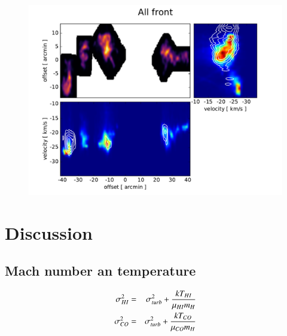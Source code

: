 \documentclass[traditabstract]{aa}
\begin{document}

\begin{figure}[h]
  \centering
  \includegraphics[page=2,width=\linewidth,trim=30 10 55 30,clip=true]{Figures/PV_diagrams.pdf}
  \caption{}
\end{figure}



\section{Discussion}
\label{sec:discussion}

   \subsection{Mach number an temperature}

\begin{eqnarray}
  \sigma_{H\rmnum{1}}^2 &=& \sigma_{turb}^2+\frac{k T_{H\rmnum{1}}}{\mu_{H\rmnum{1}} m_H} \\
  \sigma_{CO}^2         &=& \sigma_{turb}^2+\frac{k T_{CO}}{\mu_{CO} m_H}
\end{eqnarray}
\end{document}
